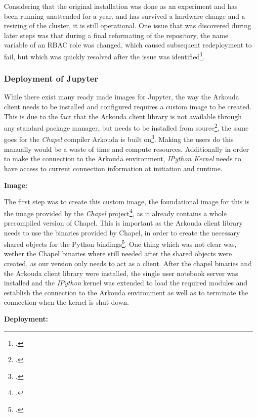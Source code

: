 Considering that the original installation was done as an experiment and has been running unattended for a year,
and has survived a hardware change and a resizing of the cluster, it is still operational.
One issue that was discovered during later steps was that during a final reformating of the repository,
the name variable of an \ac{RBAC} role was changed, which caused subsequent redeployment to fail,
but which was quickly resolved after the issue was identified\footcite{joneckerthFixingErroneousRBAC}.

\subsubsection{Deployment of Jupyter}

While there exist many ready made images for Jupyter,
the way the Arkouda client needs to be installed and configured requires a custom image to be created.
This is due to the fact that the Arkouda client library is not available through any standard package manager,
but needs to be installed from source\footcite{arkouda-repoArkoudaPydocSetup},
the same goes for the \textit{Chapel} compiler Arkouda is built on\footcite{chapel-lang.orgBuildingChapelChapel}.
Making the users do this manually would be a waste of time and compute resources.
Additionally in order to make the connection to the Arkouda environment,
\textit{IPython Kernel} needs to have access to current connection information at initiation and runtime.

\textbf{Image: }

The first step was to create this custom image,
the foundational image for this is the image provided by the \textit{Chapel} project\footcite{chapelChapelProfileDockera},
as it already contains a whole precompiled version of Chapel.
This is important as the Arkouda client library needs to use the binaries provided by Chapel,
in order to create the necessary shared objects for the Python bindings\footcite{arkouda-repoArkoudaPydocSetup}.
One thing which was not clear was, wether the Chapel binaries where still
needed after the shared objects were created, as our version only needs to act as a client.
After the chapel binaries and the Arkouda client library were installed,
the single user notebook server was installed and the \textit{IPython} kernel was
extended to load the required modules and establish the connection to the Arkouda environment as
well as to terminate the connection when the kernel is shut down.

\textbf{Deployment: }

